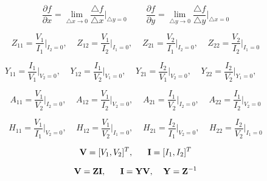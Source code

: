 {\newpage\clearpage
{}%
\begin{displaymath} \frac{\partial f}{\partial x}=\lim_{\triangle x\rightarrow 0}
   \frac{\triangle f}{\triangle x}\bigg|_{\triangle y=0}
   \;\;\;\;\;\;\;\;
   \frac{\partial f}{\partial y}=\lim_{\triangle y\rightarrow 0}
   \frac{\triangle f}{\triangle y}\bigg|_{\triangle x=0}
\end{displaymath}%
\lthtmldisplayZ
\lthtmlcheckvsize\clearpage}

{\newpage\clearpage
{}%
\begin{displaymath}	Z_{11}=\frac{V_1}{I_1}\bigg|_{I_2=0},\;\;\;\;
	Z_{12}=\frac{V_1}{I_2}\bigg|_{I_1=0},\;\;\;\;
	Z_{21}=\frac{V_2}{I_1}\bigg|_{I_2=0},\;\;\;\;
	Z_{22}=\frac{V_2}{I_2}\bigg|_{I_1=0}
\end{displaymath}%
\lthtmldisplayZ
\lthtmlcheckvsize\clearpage}

{\newpage\clearpage
{}%
\begin{displaymath}	Y_{11}=\frac{I_1}{V_1}\bigg|_{V_2=0},\;\;\;\;
	Y_{12}=\frac{I_1}{V_2}\bigg|_{V_1=0},\;\;\;\;
	Y_{21}=\frac{I_2}{V_1}\bigg|_{V_2=0},\;\;\;\;
	Y_{22}=\frac{I_2}{V_2}\bigg|_{Y_1=0},\;\;\;\;
\end{displaymath}%
\lthtmldisplayZ
\lthtmlcheckvsize\clearpage}

{\newpage\clearpage
{}%
\begin{displaymath}	A_{11}=\frac{V_1}{V_2}\bigg|_{I_2=0},\;\;\;\;
	A_{12}=\frac{V_1}{I_2}\bigg|_{V_2=0},\;\;\;\;
	A_{21}=\frac{I_1}{V_2}\bigg|_{I_2=0},\;\;\;\;
	A_{22}=\frac{I_1}{I_2}\bigg|_{V_2=0}
\end{displaymath}%
\lthtmldisplayZ
\lthtmlcheckvsize\clearpage}

{\newpage\clearpage
{}%
\begin{displaymath}	H_{11}=\frac{V_1}{I_1}\bigg|_{V_2=0},\;\;\;\;
	H_{12}=\frac{V_1}{V_2}\bigg|_{I_1=0},\;\;\;\;
	H_{21}=\frac{I_2}{I_1}\bigg|_{V_2=0},\;\;\;\;
	H_{22}=\frac{I_2}{V_2}\bigg|_{I_1=0}
\end{displaymath}%
\lthtmldisplayZ
\lthtmlcheckvsize\clearpage}

{\newpage\clearpage
{}%
\begin{displaymath}	{\bf V}=[V_1, V_2]^T,\;\;\;\;\;\;{\bf I}=[I_1, I_2]^T	\end{displaymath}%
\lthtmldisplayZ
\lthtmlcheckvsize\clearpage}

{\newpage\clearpage
{}%
\begin{displaymath} {\bf V}={\bf Z} {\bf I},\;\;\;\;\;\;{\bf I}={\bf Y} {\bf V},\;\;\;\;
	{\bf Y}={\bf Z}^{-1}		\end{displaymath}%
\lthtmldisplayZ
\lthtmlcheckvsize\clearpage}

